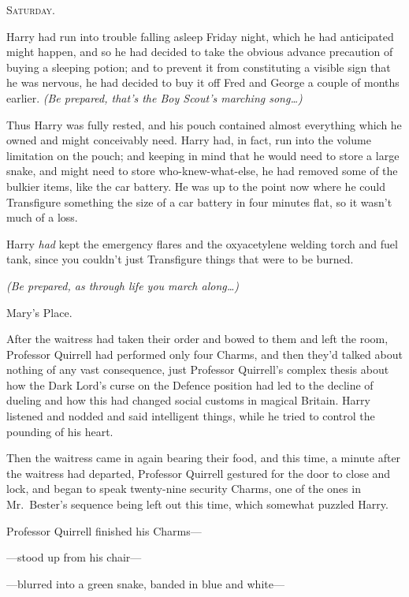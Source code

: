 
\lettrine{S}{aturday}.

\quad\quad
Harry had run into trouble falling asleep Friday night, which he had
anticipated might happen, and so he had decided to take the obvious advance
precaution of buying a sleeping potion; and to prevent it from constituting a
visible sign that he was nervous, he had decided to buy it off Fred and George
a couple of months earlier. \emph{(Be prepared, that's the Boy Scout's marching
song{\ldots})}

Thus Harry was fully rested, and his pouch contained almost everything which he
owned and might conceivably need. Harry had, in fact, run into the volume
limitation on the pouch; and keeping in mind that he would need to store a
large snake, and might need to store who-knew-what-else, he had removed some of
the bulkier items, like the car battery. He was up to the point now where he
could Transfigure something the size of a car battery in four minutes flat, so
it wasn't much of a loss.

Harry \emph{had} kept the emergency flares and the oxyacetylene welding torch
and fuel tank, since you couldn't just Transfigure things that were to be
burned.

\emph{(Be prepared, as through life you march along{\ldots})}

Mary's Place.

After the waitress had taken their order and bowed to them and left the room,
Professor Quirrell had performed only four Charms, and then they'd talked about
nothing of any vast consequence, just Professor Quirrell's complex thesis about
how the Dark Lord's curse on the Defence position had led to the decline of
dueling and how this had changed social customs in magical Britain. Harry
listened and nodded and said intelligent things, while he tried to control the
pounding of his heart.

Then the waitress came in again bearing their food, and this time, a minute
after the waitress had departed, Professor Quirrell gestured for the door to
close and lock, and began to speak twenty-nine security Charms, one of the ones
in Mr.~Bester's sequence being left out this time, which somewhat puzzled Harry.

Professor Quirrell finished his Charms---

---stood up from his chair---

---blurred into a green snake, banded in blue and white---

